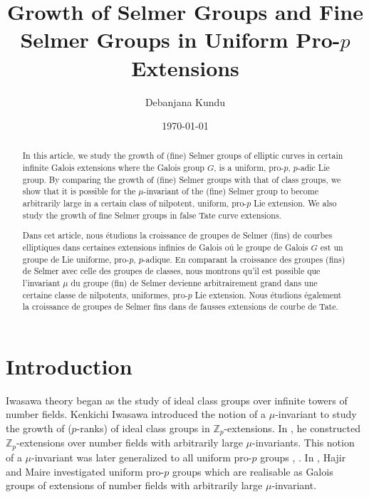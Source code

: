 \documentclass{amsart}
\newcommand{\ZZ}{\mathbb Z}
\theoremstyle{definition}
\theoremstyle{remark}
\begin{document}
\title[]{Growth of Selmer Groups and Fine Selmer Groups in Uniform Pro-$p$ Extensions}

\author{Debanjana Kundu}
\address{Department of Mathematics, University of Toronto\\
Bahen Centre, 40 St. George St., Room 6290, Toronto, Ontario, Canada, M5S 2E4}

\date{\today}


\begin{abstract}
In this article, we study the growth of (fine) Selmer groups of elliptic curves in certain infinite Galois extensions where the Galois group $G$, is a uniform, pro-$p$, $p$-adic Lie group.
By comparing the growth of (fine) Selmer groups with that of class groups, we show that it is possible for the $\mu$-invariant of the (fine) Selmer group to become arbitrarily large in a certain class of nilpotent, uniform, pro-$p$ Lie extension.
We also study the growth of fine Selmer groups in false Tate curve extensions.

Dans cet article, nous {\'e}tudions la croissance de groupes de Selmer (fins) de courbes elliptiques dans certaines extensions infinies de Galois o{\'u} le groupe de Galois $G$ est un groupe de Lie uniforme, pro-$p$, $p$-adique.
En comparant la croissance des groupes (fins) de Selmer avec celle des groupes de classes, nous montrons qu'il est possible que l'invariant $\mu$ du groupe (fin) de Selmer devienne arbitrairement grand dans une certaine classe de nilpotents, uniformes, pro-$p$ Lie extension.
Nous {\'e}tudions {\'e}galement la croissance de groupes de Selmer fins dans de fausses extensions de courbe de Tate.
\end{abstract}

\maketitle

\section{Introduction} \label{intro}
Iwasawa theory began as the study of ideal class groups over infinite towers of number fields.
Kenkichi Iwasawa introduced the notion of a $\mu$-invariant to study the growth of ($p$-ranks) of ideal class groups in $\ZZ_p$-extensions.
In \cite{Iwa73_CounterAC}, he constructed $\ZZ_p$-extensions over number fields with arbitrarily large $\mu$-invariants.
This notion of a $\mu$-invariant was later generalized to all uniform pro-$p$ groups \cite{How02}, \cite{Ven02}.
In \cite{HM19}, Hajir and Maire investigated uniform pro-$p$ groups which are realisable as Galois groups of extensions of number fields with arbitrarily large $\mu$-invariant.
\end{document}
